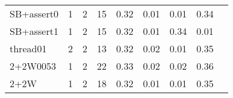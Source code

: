 {\begin{tabular}{l|r|r|r|r|r|r|r|l}
SB+assert0                                  & 1                                                                                                 & 2                                                                                                & 15                                                                                                                   & 0.32                            & 0.01                    & {\color[HTML]{00009B} 0.01}    & 0.34                       \\
SB+assert1                                  & 1                                                                                                 & 2                                                                                                & 15                                                                                                                   & 0.32                            & 0.01                    & {\color[HTML]{00009B} 0.34}    & 0.01                       \\
thread01                                    & 2                                                                                                 & 2                                                                                                & 13                                                                                                                   & 0.32                            & 0.02                    & {\color[HTML]{00009B} 0.01}    & 0.35                       \\
2+2W0053                                    & 1                                                                                                 & 2                                                                                                & 22                                                                                                                   & 0.33                            & 0.02                    & {\color[HTML]{00009B} 0.02}    & 0.36                       \\
2+2W                                        & 1                                                                                                 & 2                                                                                                & 18                                                                                                                   & 0.32                            & 0.01                    & {\color[HTML]{00009B} 0.01}    & 0.35                       \\

\end{tabular}}
